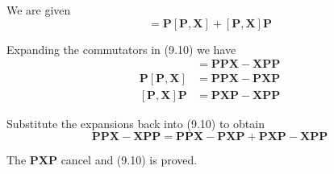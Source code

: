


\bigskip
We are given
\begin{equation*}
[\mathbf P^2,\mathbf X]
=\mathbf P[\mathbf P,\mathbf X]+[\mathbf P,\mathbf X]\mathbf P\tag{9.10}
\end{equation*}

Expanding the commutators in (9.10) we have
\begin{align*}
[\mathbf P^2,\mathbf X]
&=\mathbf P\mathbf P\mathbf X-\mathbf X\mathbf P\mathbf P
\\[1ex]
\mathbf P[\mathbf P,\mathbf X]
&=\mathbf P\mathbf P\mathbf X-\mathbf P\mathbf X\mathbf P
\\[1ex]
[\mathbf P,\mathbf X]\mathbf P
&=\mathbf P\mathbf X\mathbf P-\mathbf X\mathbf P\mathbf P
\end{align*}

Substitute the expansions back into (9.10) to obtain
\begin{equation*}
\mathbf P\mathbf P\mathbf X-\mathbf X\mathbf P\mathbf P
=\mathbf P\mathbf P\mathbf X-\mathbf P\mathbf X\mathbf P
+\mathbf P\mathbf X\mathbf P-\mathbf X\mathbf P\mathbf P
\end{equation*}

The $\mathbf P\mathbf X\mathbf P$ cancel and (9.10) is proved.


